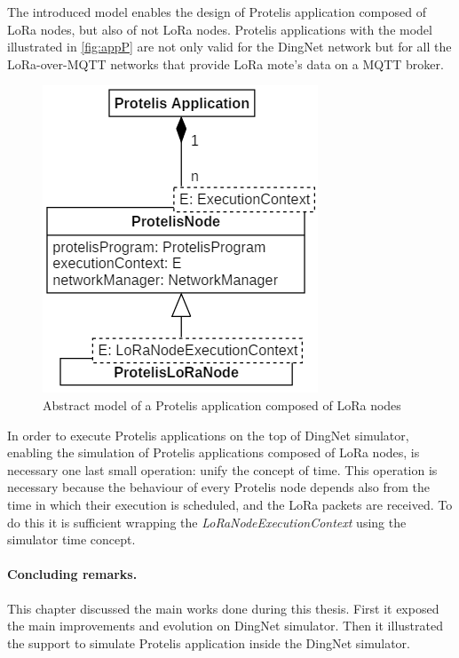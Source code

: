 % 
The introduced model enables the design of Protelis application composed of LoRa nodes, but also of not LoRa nodes.
Protelis applications with the model illustrated in \autoref{fig:appP} are not only valid for the DingNet network but for all the LoRa-over-MQTT networks that provide LoRa mote's data on a MQTT broker.
% 
\begin{figure}[H]
    \centering
    \includegraphics{figures/app.png}
    \caption{Abstract model of a Protelis application composed of LoRa nodes}
    \label{fig:appP}
\end{figure}
% 
\noindent In order to execute Protelis applications on the top of DingNet simulator, enabling the simulation of Protelis applications composed of LoRa nodes, is necessary one last small operation: unify the concept of time. 
This operation is necessary because the behaviour of every Protelis node depends also from the time in which their execution is scheduled, and the LoRa packets are received.
To do this it is sufficient wrapping the \mbox{\textit{LoRaNodeExecutionContext}} using the simulator time concept.

\paragraph{Concluding remarks.} This chapter discussed the main works done during this thesis. First it exposed the main improvements and evolution on DingNet simulator. Then it illustrated the support to simulate Protelis application inside the DingNet simulator.